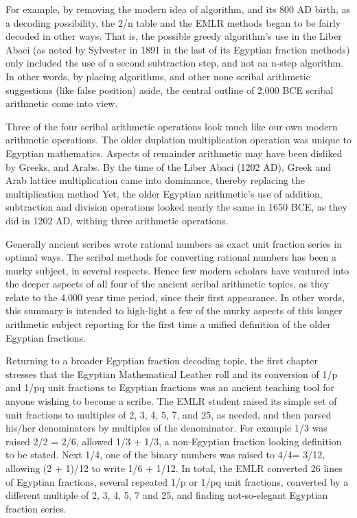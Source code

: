 \documentclass[12pt]{article}
\begin{document}
For example, by removing the modern idea of algorithm, and its 800 AD birth, as a  decoding possibility, the 2/n table and the EMLR methods began to be fairly decoded in other ways. That is, the possible greedy algorithm's use in the Liber Abaci (as noted by Sylvester in 1891 in the last of its Egyptian fraction methods) only included the use of a second subtraction step, and not an n-step algorithm. In other words, by placing algorithms, and other none scribal arithmetic suggestions (like false position) aside, the central outline of 2,000 BCE scribal arithmetic come into view. 

Three of the four scribal arithmetic operations look much like our own modern arithmetic operations. The older duplation multiplication operation was unique to Egyptian mathematics.  Aspects of remainder arithmetic may have been disliked by Greeks, and Arabs. By the time of the Liber Abaci (1202 AD), Greek and Arab lattice multiplication came into dominance, thereby replacing the multiplication method Yet, the older Egyptian arithmetic's use of addition, subtraction and division operations looked nearly the same in 1650 BCE, as they did in 1202 AD, withing three arithmetic operations.

Generally ancient scribes wrote rational numbers as exact unit fraction series in optimal ways. The scribal methods for converting rational numbers has been a murky subject, in several respects. Hence few modern scholars have ventured into the deeper aspects of all four of the ancient scribal arithmetic topics, as they relate to the 4,000 year time period, since their first appearance. In other words, this summary is intended to high-light a few of the murky aspects of this longer arithmetic subject reporting for the first time a unified definition of the older Egyptian fractions.  

Returning to a broader Egyptian fraction decoding topic, the first chapter stresses that the Egyptian  Mathematical Leather roll and its conversion of 1/p and 1/pq unit fractions to Egyptian fractions was an ancient teaching tool for anyone wishing to become a scribe. The EMLR student raised its simple set of unit fractions to multiples of 2, 3, 4, 5, 7, and 25, as needed, and then parsed his/her denominators by multiples of the denominator. For example 1/3 was raised 2/2 = 2/6, allowed 1/3 + 1/3, a non-Egyptian fraction looking definition to be stated. Next 1/4, one of the binary numbers was raised to 4/4= 3/12, allowing (2 + 1)/12 to write 1/6 + 1/12. In total, the EMLR converted 26 lines of  Egyptian fractions, several repeated 1/p or 1/pq unit fractions, converted by a different multiple of 2, 3, 4, 5, 7 and 25, and finding not-so-elegant Egyptian fraction series.
\end{document}
